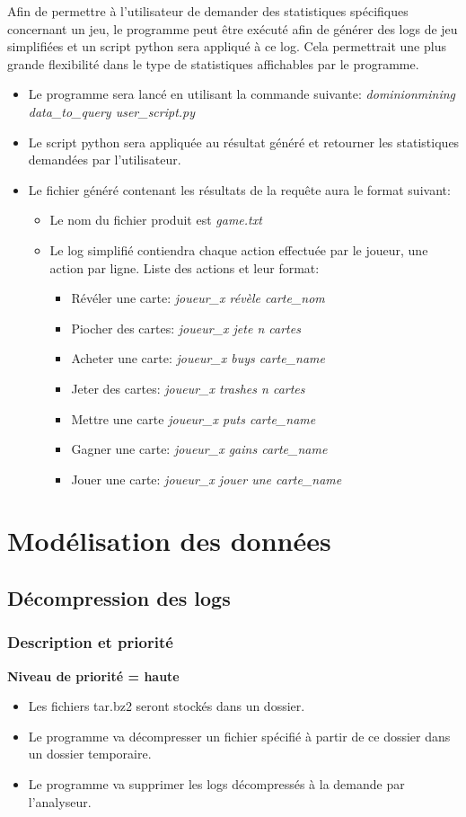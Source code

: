 \documentclass{scrreprt}
\begin{document}
Afin de permettre à l'utilisateur de demander des statistiques spécifiques concernant un jeu, le programme peut être exécuté afin de générer des logs de jeu simplifiées et un script python sera appliqué à ce log. Cela permettrait une plus grande flexibilité dans le type de statistiques affichables par le programme.
\begin{itemize}
\item Le programme sera lancé en utilisant la commande suivante: \textit{dominionmining data\_to\_query user\_script.py}
 \item Le script python sera appliquée au résultat généré et retourner les statistiques demandées par l'utilisateur.
\item Le fichier généré contenant les résultats de la requête aura le format suivant:
\begin{itemize}
\item Le nom du fichier produit est \textit{game.txt}
\item Le log simplifié contiendra chaque action effectuée par le joueur, une action par ligne. Liste des actions et leur format:
\begin{itemize}
\item Révéler une carte: \textit{joueur\_x révèle carte\_nom}
\item Piocher des cartes: \textit{joueur\_x jete n cartes}
\item Acheter une carte: \textit{joueur\_x buys carte\_name}
\item Jeter des cartes: \textit{joueur\_x trashes n cartes}
\item Mettre une carte \textit{joueur\_x puts carte\_name}
\item Gagner une carte: \textit{joueur\_x gains carte\_name}
\item Jouer une carte: \textit{joueur\_x jouer une carte\_name}

\end{itemize}
\end{itemize}
\end{itemize}
\fi
\section{Modélisation des données}

\subsection{Décompression des logs}
\subsubsection{Description et priorité}
\textbf{Niveau de priorité = haute}\\
\begin{itemize}
  \item Les fichiers tar.bz2 seront stockés dans un dossier.
  \item Le programme va  décompresser un fichier spécifié à partir de ce dossier dans un dossier temporaire.
  \item Le programme va  supprimer les logs décompressés  à la demande par l'analyseur.
\end{itemize}
\end{document}
